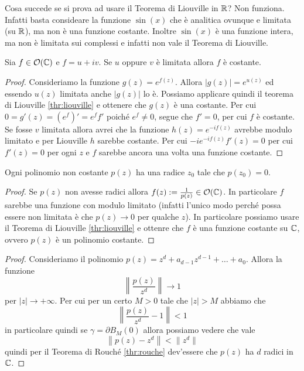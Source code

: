 \begin{remark}
	Cosa succede se si prova ad usare il Teorema di Liouville in $\mathbb{R}$? 
	Non funziona. Infatti basta consideare la funzione $\sin(x)$ che è 
	analitica ovunque e limitata (su $\mathbb{R}$), ma non è una funzione costante. 
	Inoltre $\sin(x)$ è una funzione intera, ma non è limitata sui complessi
	e infatti non vale il Teorema di Liouville.
\end{remark}

\begin{corollary}
  Sia $f \in \mathcal{O}(\mathbb{C})$ e $f = u + iv$. Se $u$ oppure $v$ è limitata
  allora $f$ è costante.
  \label{cor:stronger-liouville-constant-function}
\end{corollary}
\begin{proof}
  Consideriamo la funzione $g(z) = e^{f(z)}$. Allora $|g(z)| = e^{u(z)}$ ed
  essendo $u(z)$ limitata anche $|g(z)|$ lo è. Possiamo applicare quindi il
  teorema di Liouville \ref{thr:liouville} e ottenere che $g(z)$ è una
  costante. Per cui $0 = g'(z) = (e^f)' = e^f f'$ poiché $e^f \neq 0$, segue
  che $f' = 0$, per cui $f$ è costante.\\
  
  Se fosse $v$ limitata allora avrei che la funzione $h(z) = e^{-if(z)}$
  avrebbe modulo limitato e per Liouville $h$ sarebbe costante. Per cui
  $-i e^{-if(z)} f'(z) = 0$ per cui $f'(z) = 0$ per ogni $z$ e $f$ sarebbe
  ancora una volta una funzione costante.
\end{proof}

\begin{theorem}
  Ogni polinomio non costante $p(z)$ ha una radice $z_0$ tale che $p(z_0)
  = 0$. 
  \label{thr:fondamentale-dell-algebra}
\end{theorem}
\begin{proof}
  Se $p(z)$ non avesse radici allora $f(z) := \frac{1}{p(z)} \in
  \mathcal{O}(\mathbb{C})$. In particolare $f$ sarebbe una funzione con modulo
  limitato (infatti l'unico modo perché possa essere non limitata è che
  $p(z) \to 0$ per qualche $z$). In particolare possiamo usare il Teorema di
  Liouville \ref{thr:liouville} e ottenre che $f$ è una funzione costante su
  $\mathbb{C}$, ovvero $p(z)$ è un polinomio costante.
\end{proof}
\begin{proof}
  Consideriamo il polinomio $p(z) = z^d + a_{d-1}z^{d-1} + \dots + a_0$. 
  Allora la funzione 
  \begin{equation*}
  		\left\| \frac{p(z)}{z^d} \right\| \to 1
  \end{equation*}
  per $|z| \to +\infty$. Per cui per un certo $M > 0$ tale che $|z| > M$ 
  abbiamo che
  \begin{equation*}
	  	\left\|\frac{p(z)}{z^d} - 1\right\| < 1
  \end{equation*} 
  in particolare quindi se $\gamma = \partial B_M(0)$ allora possiamo vedere 
  che vale 
  \begin{equation*}
	  \left\|p(z) - z^d\right\| < \|z^d\|
  \end{equation*} 
  quindi per il Teorema di Rouché \ref{thr:rouche} dev'essere che $p(z)$ ha 
  $d$ radici in $\mathbb{C}$.
\end{proof}

